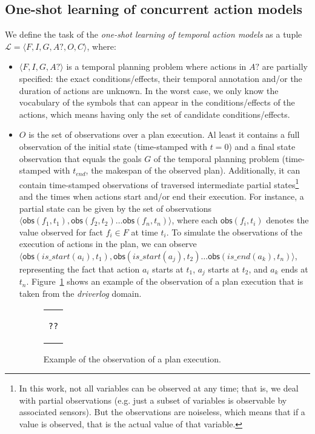 \documentclass{ecai}
\newcommand{\tup}[1]{{\langle #1 \rangle}}
\newcommand{\obs}{\mathsf{obs}}    %
\begin{document}
\subsection{One-shot learning of concurrent action models}
\label{subsec:ones}

We define the task of the {\em one-shot learning of temporal action models} as a tuple $\mathcal{L}=\tup{F,I,G,A?,O,C}$, where:

\begin{itemize}
	
\item $\tup{F,I,G,A?}$ is a temporal planning problem where actions in $A?$ are partially specified: the exact conditions/effects, their temporal annotation and/or the duration of actions are unknown. In the worst case, we only know the vocabulary of the symbols that can appear in the conditions/effects of the actions, which means having only the set of candidate conditions/effects. 

\item $O$ is the set of observations over a plan execution. Al least it contains a full observation of the initial state (time-stamped with $t=0$) and a final state observation that equals the goals $G$ of the temporal planning problem (time-stamped with $t_{end}$, the makespan of the observed plan). Additionally, it can contain time-stamped observations of traversed intermediate partial states\footnote{In this work, not all variables can be observed at any time; that is, we deal with partial observations (e.g. just a subset of variables is observable by associated sensors). But the observations are noiseless, which means that if a value is observed, that is the actual value of that variable.} and the times when actions start and/or end their execution. For instance, a partial state can be given by the set of observations $\tup{\obs(f_1,t_1),\obs(f_2,t_2)\ldots \obs(f_n,t_n)}$, where each $\obs(f_i,t_i)$ denotes the value observed for fact $f_i \in F$ at time $t_i$. To simulate the observations of the execution of actions in the plan, we can observe $\tup{\obs(is\_start(a_i),t_1),\obs(is\_start(a_j),t_2)\ldots \obs(is\_end(a_k),t_n)}$, representing the fact that action $a_i$ starts at $t_1$, $a_j$ starts at $t_2$, and $a_k$ ends at $t_n$. Figure~\ref{fig:exampleObservations} shows an example of the observation of a plan execution that is taken from the {\em driverlog} domain.

\begin{figure}
\begin{tabular}{p{5cm}}
\begin{scriptsize}    
\begin{verbatim}
??
\end{verbatim}
\end{scriptsize}    
\end{tabular}
\caption{Example of the observation of a plan execution.}
\label{fig:exampleObservations}
\end{figure}



\end{itemize}
\end{document}
